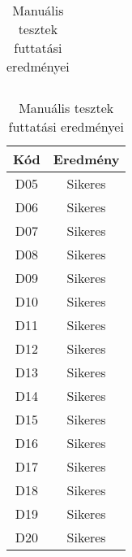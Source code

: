 \begin{table}[H]
\begin{tabular}{|c|c|}
		\hline
	\end{tabular}
	\begin{tabular}{|c|c|}
		\hline
		\textbf{Kód} & \textbf{Eredmény} \\
		\hline
		D05 & Sikeres \\
		\hline
		D06 & Sikeres \\
		\hline
		D07 & Sikeres \\
		\hline
		D08 & Sikeres \\
		\hline
		D09 & Sikeres \\
		\hline
		D10 & Sikeres \\
		\hline
		D11 & Sikeres \\
		\hline
		D12 & Sikeres \\
		\hline
		D13 & Sikeres \\
		\hline
		D14 & Sikeres \\
		\hline
		D15 & Sikeres \\
		\hline
		D16 & Sikeres \\
		\hline
		D17 & Sikeres \\
		\hline
		D18 & Sikeres \\
		\hline
		D19 & Sikeres \\
		\hline
		D20 & Sikeres \\
		\hline
	\end{tabular}
	\caption{Manuális tesztek futtatási eredményei}
\end{table}




























